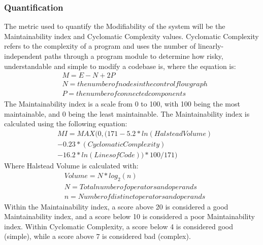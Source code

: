 \documentclass[12pt]{article}
\begin{document}
\subsubsection{Quantification}
The metric used to quantify the Modifiability of the system will be the Maintainability index and Cyclomatic Complexity values. Cyclomatic Complexity refers to the complexity of a program and uses the number of linearly-independent paths through a program module to determine how risky, understandable and simple to modify a codebase is, where the equation is:
\begin{equation}
    \begin{aligned}
         & M = E - N + 2P                                    \\
         & N = the number of nodes in the control flow graph \\
         & P = the number of connected components
    \end{aligned}
\end{equation}
The Maintainability index is a scale from 0 to 100, with 100 being the most maintainable, and 0 being the least maintainable. The Maintainability index is calculated using the following equation:
\begin{equation}
    \begin{aligned}
         & MI = MAX(0, (171 - 5.2 * ln(Halstead Volume) \\
         & - 0.23 * (Cyclomatic Complexity)             \\
         & - 16.2 * ln(Lines of Code)) * 100 / 171)
    \end{aligned}
\end{equation}
Where Halstead Volume is calculated with:
\begin{equation}
    \begin{aligned}
         & Volume = N * log_2(n)                         \\
         & N = Total number of operators and operands    \\
         & n = Number of distinct operators and operands
    \end{aligned}
\end{equation}
Within the Maintainability index, a score above 20 is considered a good Maintainability index, and a score below 10 is considered a poor Maintainability index.
Within Cyclomatic Complexity, a score below 4 is considered good (simple), while a score above 7 is considered bad (complex).
\end{document}
